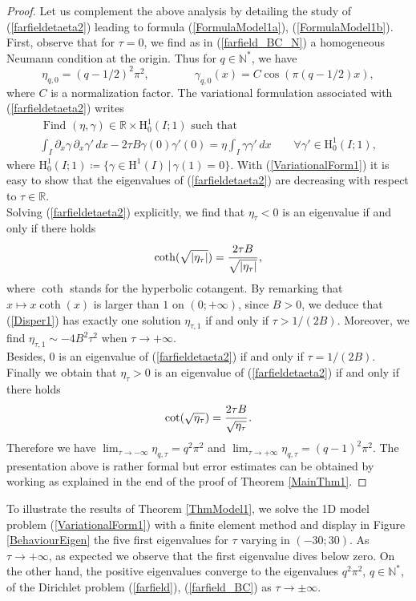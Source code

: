 \documentclass[11pt,a4paper]{article}
\newcommand{\dsp}{\displaystyle}
\newcommand{\mrm}[1]{\mathrm{#1}}
\newcommand{\N}{\mathbb{N}}
\newcommand{\R}{\mathbb{R}}
\newcommand{\mH}{\mrm{H}}
\begin{document}
\begin{proof}
Let us complement the above analysis by detailing the study of (\ref{farfieldetaeta2}) leading to formula (\ref{FormulaModel1a}), (\ref{FormulaModel1b}). First, observe that for $\tau=0$, we find as in (\ref{farfield_BC_N}) a homogeneous Neumann condition at the origin. Thus for $q\in\N^\ast$, we have
\[
\eta_{q,0}=(q-1/2)^2\pi^2,\qquad\qquad  \gamma_{q,0}(x)=C \cos(\pi(q-1/2)x),
\]
where $C$ is a normalization factor. The variational formulation associated with (\ref{farfieldetaeta2}) writes
\begin{equation}\label{VariationalForm1}
\begin{array}{|l}
\mbox{ Find }(\eta,\gamma)\in\R\times \mH^1_{0}(I;1)\mbox{ such that }\\[3pt]
\dsp\int_I \partial_x\gamma\,\partial_x\gamma' \,dx-2\tau B\gamma(0)\gamma'(0) = \eta \int_I \gamma\gamma' \,dx\qquad \forall \gamma'\in\mH^1_{0}(I;1),
\end{array}
\end{equation}
where $\mH^1_{0}(I;1)\coloneqq\{\gamma\in\mH^1(I)\,|\,\gamma(1)=0\}$. With (\ref{VariationalForm1}) it is easy to show that the eigenvalues of (\ref{farfieldetaeta2}) are decreasing with respect to $\tau\in\R$.\\ 
Solving (\ref{farfieldetaeta2}) explicitly, we find that $\eta_\tau<0$ is an eigenvalue if and only if there holds 
\begin{equation}\label{Disper1}
\coth(\sqrt{|\eta_\tau|})=\cfrac{2\tau B}{\sqrt{|\eta_\tau|}}\,,
\end{equation}
where $\coth$ stands for the hyperbolic cotangent. By remarking that $x\mapsto x \coth(x)$ is larger than $1$ on $(0;+\infty)$, since $B>0$, we deduce that (\ref{Disper1}) has exactly one solution $\eta_{\tau,1}$ if and only if $\tau>1/(2B)$. Moreover, we find $\eta_{\tau,1}\sim-4B^2\tau^2$ when $\tau\to+\infty$.\\
Besides, $0$ is an eigenvalue of (\ref{farfieldetaeta2}) if and only if $\tau=1/(2B)$.\\ Finally we obtain that $\eta_\tau>0$ is an eigenvalue of (\ref{farfieldetaeta2}) if and only if there holds 
\begin{equation}\label{Disper2}
\cot(\sqrt{\eta_\tau})=\cfrac{2\tau B}{\sqrt{\eta_\tau}}\,.
\end{equation}
Therefore we have $\lim_{\tau\to-\infty}\eta_{q,\tau}=q^2\pi^2$ and $\lim_{\tau\to+\infty}\eta_{q,\tau}=(q-1)^2\pi^2$. The presentation above is rather formal but error estimates can be obtained by working as explained in the end of the proof of Theorem \ref{MainThm1}. 
\end{proof}
\noindent To illustrate the results of Theorem \ref{ThmModel1}, we solve the 1D model problem (\ref{VariationalForm1}) with a finite element method and display in Figure \ref{BehaviourEigen} the five first eigenvalues for $\tau$ varying in $(-30;30)$. As $\tau\to+\infty$, as expected we observe that the first eigenvalue dives below zero. On the other hand, the positive eigenvalues converge to the eigenvalues $q^2\pi^2$, $q\in\N^\ast$, of the Dirichlet problem (\ref{farfield}), (\ref{farfield_BC}) as $\tau\to\pm\infty$.
\end{document}
